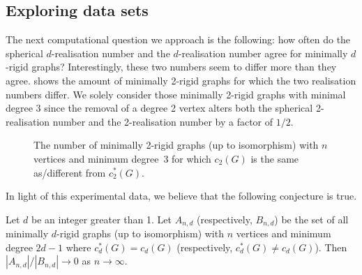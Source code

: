 \documentclass[ALCO]{cedram}
\begin{document}
\subsection{Exploring data sets}

The next computational question we approach is the following:
how often do the spherical $d$-realisation number and the $d$-realisation number agree for minimally $d$-rigid graphs?
Interestingly, these two numbers seem to differ more than they agree.
 shows the amount of minimally 2-rigid graphs for which the two realisation numbers differ.
We solely consider those minimally 2-rigid graphs with minimal degree 3 since the removal of a degree 2 vertex alters both the spherical 2-realisation number and the 2-realisation number by a factor of $1/2$.

\begin{figure}[ht]
  \centering

  \caption{The number of minimally 2-rigid graphs (up to isomorphism) with $n$ vertices and minimum degree~3 for which $c_2(G)$ is the same as/different from $c_2^*(G)$.}
  \label{tab:differences}
\end{figure}

In light of this experimental data,
we believe that the following conjecture is true.

\begin{conjecture}
	Let $d$ be an integer greater than 1.
	Let $A_{n,d}$ \textup{(}respectively, $B_{n,d}$\textup{)} be the set of all minimally $d$-rigid graphs \textup{(}up to isomorphism\textup{)} with $n$ vertices and minimum degree $2d-1$ where $c^*_d(G)=c_d(G)$ \textup{(}respectively, $c^*_d(G)\neq c_d(G)$\textup{)}.
	Then $|A_{n,d}|/ |B_{n,d}| \rightarrow 0$ as $n \rightarrow \infty$.
\end{conjecture}
\end{document}
